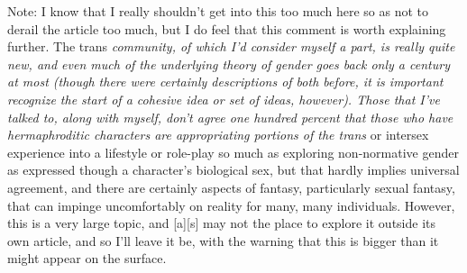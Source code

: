 Note: I know that I really shouldn't get into this too much here so as not to derail the article too much, but I do feel that this comment is worth explaining further. The trans\emph{ community, of which I'd consider myself a part, is really quite new, and even much of the underlying theory of gender goes back only a century at most (though there were certainly descriptions of both before, it is important recognize the start of a cohesive idea or set of ideas, however). Those that I've talked to, along with myself, don't agree one hundred percent that those who have hermaphroditic characters are appropriating portions of the trans} or intersex experience into a lifestyle or role-play so much as exploring non-normative gender as expressed though a character's biological sex, but that hardly implies universal agreement, and there are certainly aspects of fantasy, particularly sexual fantasy, that can impinge uncomfortably on reality for many, many individuals. However, this is a very large topic, and {[}a{]}{[}s{]} may not the place to explore it outside its own article, and so I'll leave it be, with the warning that this is bigger than it might appear on the surface.

